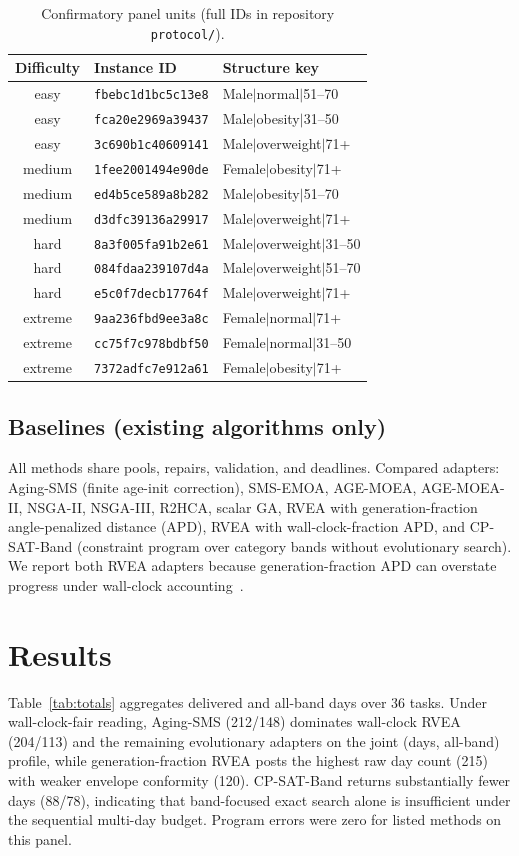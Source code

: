\documentclass{ieeeaccess}
\begin{document}
\begin{table}[!t]
\caption{Confirmatory panel units (full IDs in repository \texttt{protocol/}).}
\label{tab:panel}
\centering
\scriptsize
\begin{tabular}{@{}cll@{}}
\toprule
Difficulty & Instance ID & Structure key \\
\midrule
easy & \texttt{fbebc1d1bc5c13e8} & Male$|$normal$|$51--70 \\
easy & \texttt{fca20e2969a39437} & Male$|$obesity$|$31--50 \\
easy & \texttt{3c690b1c40609141} & Male$|$overweight$|$71+ \\
medium & \texttt{1fee2001494e90de} & Female$|$obesity$|$71+ \\
medium & \texttt{ed4b5ce589a8b282} & Male$|$obesity$|$51--70 \\
medium & \texttt{d3dfc39136a29917} & Male$|$overweight$|$71+ \\
hard & \texttt{8a3f005fa91b2e61} & Male$|$overweight$|$31--50 \\
hard & \texttt{084fdaa239107d4a} & Male$|$overweight$|$51--70 \\
hard & \texttt{e5c0f7decb17764f} & Male$|$overweight$|$71+ \\
extreme & \texttt{9aa236fbd9ee3a8c} & Female$|$normal$|$71+ \\
extreme & \texttt{cc75f7c978bdbf50} & Female$|$normal$|$31--50 \\
extreme & \texttt{7372adfc7e912a61} & Female$|$obesity$|$71+ \\
\bottomrule
\end{tabular}
\end{table}

\subsection{Baselines (existing algorithms only)}
All methods share pools, repairs, validation, and deadlines. Compared adapters: Aging-SMS (finite age-init correction), SMS-EMOA, AGE-MOEA, AGE-MOEA-II, NSGA-II, NSGA-III, R2HCA, scalar GA, RVEA with generation-fraction angle-penalized distance (APD), RVEA with wall-clock-fraction APD, and CP-SAT-Band (constraint program over category bands without evolutionary search). We report both RVEA adapters because generation-fraction APD can overstate progress under wall-clock accounting~\cite{metaheuristics2021}.

\section{Results}
\label{sec:results}
Table~\ref{tab:totals} aggregates delivered and all-band days over 36 tasks. Under wall-clock-fair reading, Aging-SMS (212/148) dominates wall-clock RVEA (204/113) and the remaining evolutionary adapters on the joint (days, all-band) profile, while generation-fraction RVEA posts the highest raw day count (215) with weaker envelope conformity (120). CP-SAT-Band returns substantially fewer days (88/78), indicating that band-focused exact search alone is insufficient under the sequential multi-day budget. Program errors were zero for listed methods on this panel.
\end{document}

